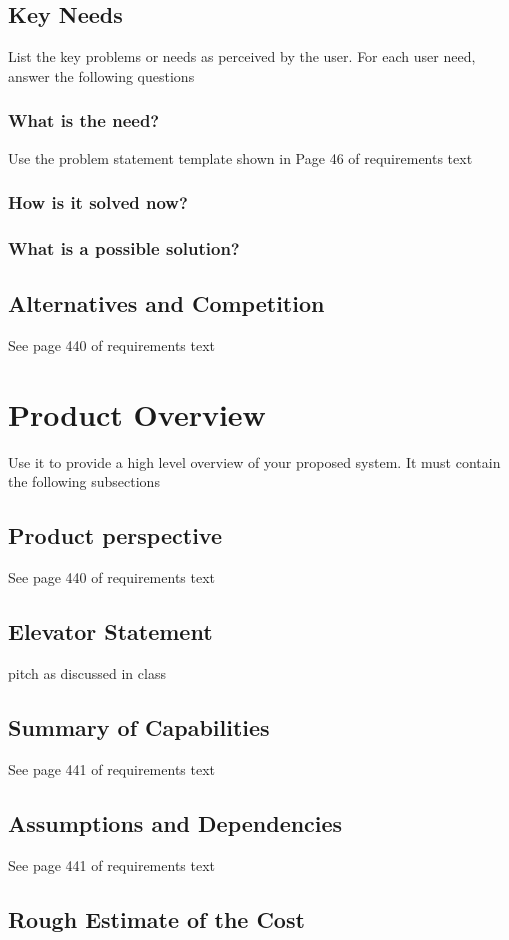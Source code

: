 \documentclass{article}
\begin{document}
\subsection{Key Needs}
List the key problems or needs as perceived by the user. For each user need, answer the following questions
\subsubsection{What is the need?}
Use the problem statement template shown in Page 46 of requirements text
\subsubsection{How is it solved now?}
\subsubsection{What is a possible solution?}
\subsection{Alternatives and Competition}
See page 440 of requirements text
\section{Product Overview}
Use it to provide a high level overview of your proposed system. It must contain the following subsections
\subsection{Product perspective}
See page 440 of requirements text
\subsection{Elevator Statement}
pitch as discussed in class
\subsection{Summary of Capabilities}
See page 441 of requirements text
\subsection{Assumptions and Dependencies}
See page 441 of requirements text
\subsection{Rough Estimate of the Cost}
\end{document}
